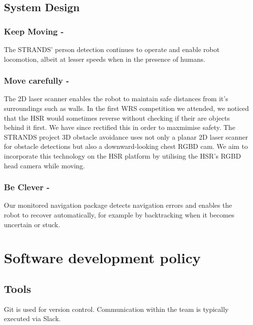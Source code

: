 \documentclass[runningheads,a4paper]{llncs}
\begin{document}
\subsection{System Design}

\subsubsection{Keep Moving - }
The STRANDS' person detection continues to operate and enable robot locomotion, albeit at lesser speeds when in the presence of humans.

\subsubsection{Move carefully - }
The 2D laser scanner enables the robot to maintain safe distances from it's surroundings such as walls. In the first WRS competition we attended, we noticed that the HSR would sometimes reverse without checking if their are objects behind it first. We have since rectified this in order to maxmimise safety. The STRANDS project 3D obstacle avoidance uses not only a planar 2D laser scanner for obstacle detections but also a downward-looking chest RGBD cam. We aim to incorporate this technology on the HSR platform by utilising the HSR's RGBD head camera while moving. 

\subsubsection{Be Clever - }
Our monitored navigation package detects navigation errors and enables the robot to recover automatically, for example by backtracking when it becomes uncertain or stuck. 

\section{Software development policy}
\subsection{Tools}
Git is used for version control. Communication within the team is typically executed via Slack.
\end{document}
